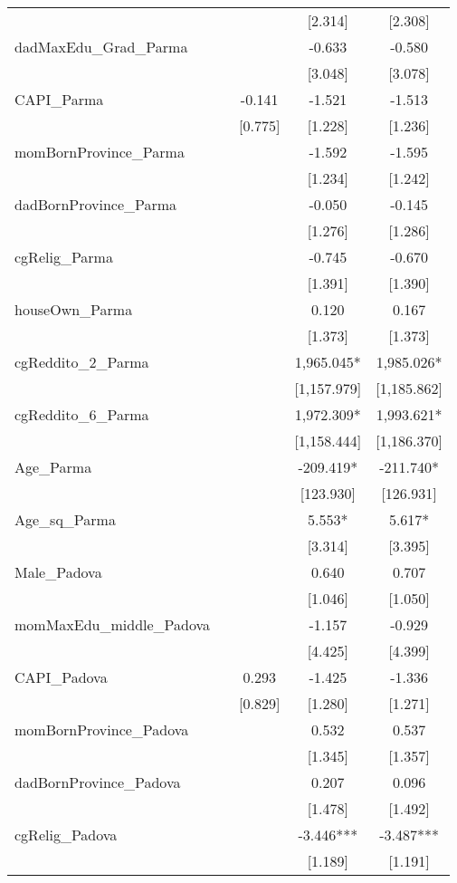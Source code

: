 \documentclass[]{article}
\begin{document}
\begin{tabular}{lcccc}
 &  &  & [2.314] & [2.308] \\
dadMaxEdu\_Grad\_Parma &  &  & -0.633 & -0.580 \\
 &  &  & [3.048] & [3.078] \\
CAPI\_Parma &  & -0.141 & -1.521 & -1.513 \\
 &  & [0.775] & [1.228] & [1.236] \\
momBornProvince\_Parma &  &  & -1.592 & -1.595 \\
 &  &  & [1.234] & [1.242] \\
dadBornProvince\_Parma &  &  & -0.050 & -0.145 \\
 &  &  & [1.276] & [1.286] \\
cgRelig\_Parma &  &  & -0.745 & -0.670 \\
 &  &  & [1.391] & [1.390] \\
houseOwn\_Parma &  &  & 0.120 & 0.167 \\
 &  &  & [1.373] & [1.373] \\
cgReddito\_2\_Parma &  &  & 1,965.045* & 1,985.026* \\
 &  &  & [1,157.979] & [1,185.862] \\
cgReddito\_6\_Parma &  &  & 1,972.309* & 1,993.621* \\
 &  &  & [1,158.444] & [1,186.370] \\
Age\_Parma &  &  & -209.419* & -211.740* \\
 &  &  & [123.930] & [126.931] \\
Age\_sq\_Parma &  &  & 5.553* & 5.617* \\
 &  &  & [3.314] & [3.395] \\
Male\_Padova &  &  & 0.640 & 0.707 \\
 &  &  & [1.046] & [1.050] \\
momMaxEdu\_middle\_Padova &  &  & -1.157 & -0.929 \\
 &  &  & [4.425] & [4.399] \\
CAPI\_Padova &  & 0.293 & -1.425 & -1.336 \\
 &  & [0.829] & [1.280] & [1.271] \\
momBornProvince\_Padova &  &  & 0.532 & 0.537 \\
 &  &  & [1.345] & [1.357] \\
dadBornProvince\_Padova &  &  & 0.207 & 0.096 \\
 &  &  & [1.478] & [1.492] \\
cgRelig\_Padova &  &  & -3.446*** & -3.487*** \\
 &  &  & [1.189] & [1.191] \\

\end{tabular}
\end{document}

